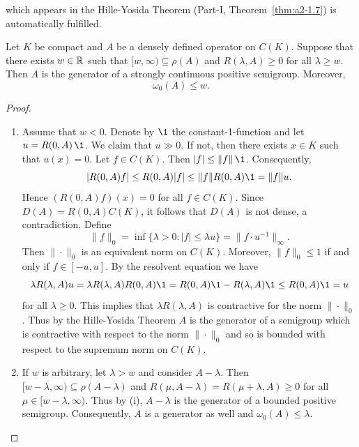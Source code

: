 which appears in the Hille-Yosida Theorem (Part-I, Theorem~\ref{thm:a2-1.7}) is automatically fulfilled.
\begin{theorem}\label{thm:b2-1.8}
Let $K$ be compact and $A$ be a densely defined operator on $C(K)$.
Suppose that there exists $w \in \mathbb{R}$ such that $[w,\infty) \subseteq \rho(A)$ and $R(\lambda,A) \geq 0$ for all $\lambda \geq w$.
Then $A$ is the generator of a strongly continuous positive semigroup.
Moreover,
\begin{equation}\label{eq:b2-1.3}
    \omega_{0}(A) \leq w.
\end{equation}
\end{theorem}
\begin{proof} 
\begin{enumerate}[\upshape (i), wide, labelindent=.25em]
\item \label{thm:b2-1.8-1}
Assume that $w < 0$.
Denote by $\1$ the constant-1-function and let $u = R(0,A)\,\1$.
We claim that $u \gg 0$.
If not, then there exists $x \in K$ such that $u(x) = 0$.
Let $f \in C(K)$.
Then $|f| \leq \|f\| \, \1$.
Consequently, 
%
\[
	\vert R(0,A)f \vert \leq R(0,A)|f| \leq \|f\|R(0,A)\1 = \|f\|u.
\]
%
Hence $(R(0,A)f)(x) = 0$ for all $f \in C(K)$.
Since $D(A) = R(0,A)C(K)$, it follows that $D(A)$ is not dense, a contradiction.
Define 
\[\|f\|_{0} = \inf \{\lambda > 0 \colon |f| \leq \lambda u\} = \|f \cdot u^{-1} \|_{\infty}.
\]
Then $\|\cdot\|_{0}$ is an equivalent norm on $C(K)$.
Moreover, $\|f\|_{0} \leq 1$ if and only if\/ $f \in [-u,u]$.
By the resolvent equation we have 
\[
\lambda R(\lambda,A)u = \lambda R(\lambda,A)R(0,A)\1 = R(0,A)\1 - R(\lambda,A)\1 \leq R(0,A)\1 = u 
\]
for all $\lambda \geq 0$.
This implies that $\lambda R(\lambda,A)$ is contractive for the norm $\|\cdot\|_{0}$.
Thus by the Hille-Yosida Theorem $A$ is the generator of a semigroup which is contractive with respect to the norm $\|\cdot\|_{0}$ and so is bounded with respect to the supremum norm on $C(K)$.

\item \label{thm:b2-1.8-2}
If\/ $w$ is arbitrary, let $\lambda > w$ and consider $A - \lambda$.
Then $[w-\lambda,\infty) \subseteq \rho(A-\lambda)$ and $R(\mu,A-\lambda) = R(\mu+\lambda,A) \geq 0$ for all $\mu \in [w-\lambda,\infty)$.
Thus by (i), $A - \lambda$ is the generator of a bounded positive semigroup.
Consequently, $A$ is a generator as well and $\omega_{0}(A) \leq \lambda$.
\qedhere
\end{enumerate}
\end{proof}
